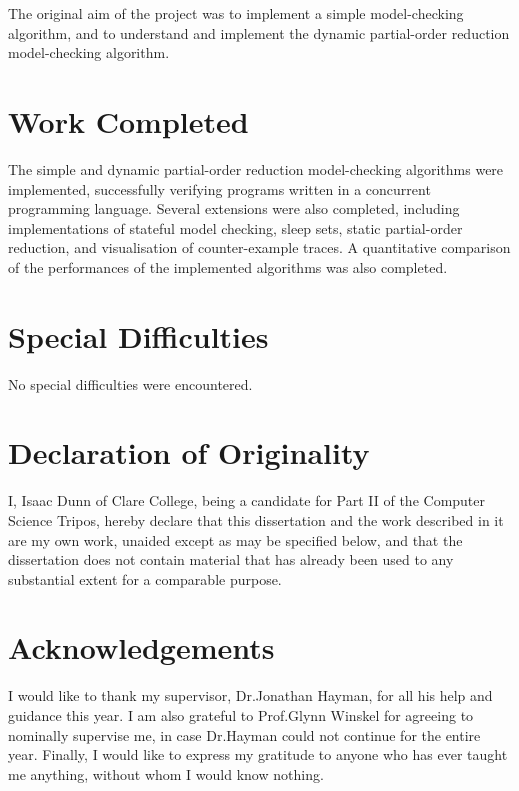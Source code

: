 \documentclass[12pt,a4paper,twoside,openany]{report}
\begin{document}
The original aim of the project was to implement
a simple model-checking algorithm, and to
understand and implement the dynamic partial-order reduction
model-checking algorithm.

\section*{Work Completed}

The simple and dynamic partial-order reduction
model-checking algorithms
were implemented, successfully verifying
programs written in a concurrent programming language.
Several extensions were
also completed, including implementations of
stateful model checking, sleep sets,
static partial-order reduction,
and visualisation of counter-example
traces. A quantitative comparison of the
performances of the implemented
algorithms was also completed.

\section*{Special Difficulties}

No special difficulties were encountered.
 
\section*{Declaration of Originality}

I, Isaac Dunn of Clare College, being a candidate for Part II of the Computer
Science Tripos, hereby declare
that this dissertation and the work described in it are my own work,
unaided except as may be specified below, and that the dissertation
does not contain material that has already been used to any substantial
extent for a comparable purpose.

\bigskip
{}

\bigskip
{}

\bigskip\bigskip
\section*{Acknowledgements}

I would like to thank my supervisor,
Dr.\@ Jonathan Hayman, for all his help
and guidance this year. I am
also grateful to Prof.\@ Glynn Winskel for
agreeing to nominally supervise me,
in case Dr.\@ Hayman could not continue
for the entire year. Finally, I would
like to express my gratitude to anyone
who has ever taught me anything, without
whom I would know nothing.
\end{document}
